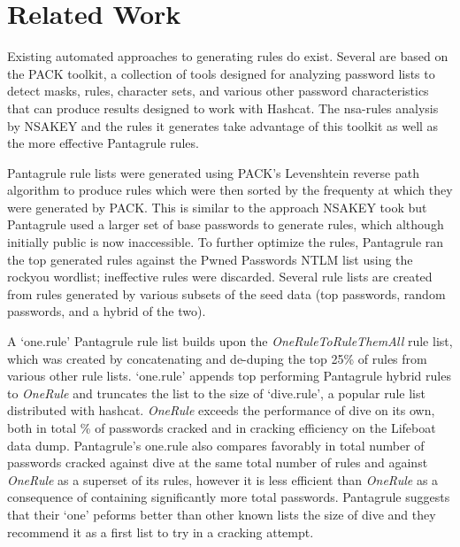 \documentclass[letterpaper,twocolumn,10pt]{article}
\begin{document}



\section{Related Work}

Existing automated approaches to generating rules do exist. Several are based on the PACK toolkit,\cite{PACK}
a collection of tools designed for analyzing password lists to detect masks, rules, character sets,
and various other password characteristics that can produce results designed to work with Hashcat.
The nsa-rules analysis by NSAKEY\cite{NSAKEY} and the rules it generates take advantage of this toolkit as well as the more
effective Pantagrule rules.\cite{pantagrule}

Pantagrule rule lists were generated using PACK's Levenshtein reverse path algorithm to produce rules which
were then sorted by the frequenty at which they were generated by PACK. This is similar to the approach NSAKEY took but
Pantagrule used a larger set of base passwords to generate rules, which although initially public is
now inaccessible. To further optimize the rules, Pantagrule ran the top generated rules against the
Pwned Passwords NTLM list using the rockyou wordlist; ineffective rules were discarded. Several
rule lists are created from rules generated by various subsets of the seed data (top passwords, random passwords, and a hybrid of the two).

A `one.rule' Pantagrule rule list builds upon the \textit{OneRuleToRuleThemAll}
rule list, which was created by concatenating and de-duping the top 25\% of rules
from various other rule lists.\cite{ortrta} `one.rule' appends top performing Pantagrule hybrid rules to \textit{OneRule}
and truncates the list to the size of `dive.rule', a popular rule list distributed with hashcat.
\textit{OneRule} exceeds the performance of dive on its own, both in total \% of passwords cracked and in
cracking efficiency on the Lifeboat data dump. Pantagrule's one.rule also compares favorably in total number of
passwords cracked against dive at the same total number of rules and against \textit{OneRule} as a superset
of its rules, however it is less efficient than \textit{OneRule} as a consequence of containing significantly more
total passwords. Pantagrule suggests that their `one' peforms better than other known lists the size of dive
and they recommend it as a first list to try in a cracking attempt.
\end{document}
